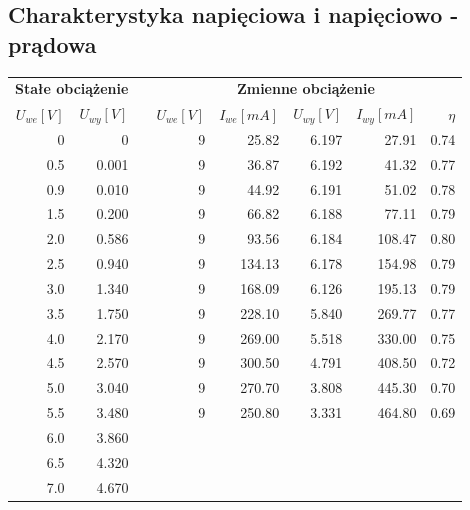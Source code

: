 \documentclass[a4paper,12pt]{article}
\begin{document}
\subsection{Charakterystyka napięciowa i napięciowo - prądowa}
  \begin{center}
  \begin{tabular}{|r|r|r|r|r|r|r|r|}
    \hline
    \multicolumn{2}{|c|}{\textbf{Stałe obciążenie}} &  & \multicolumn{5}{c|}{\textbf{Zmienne obciążenie}} \\ \cline{1-2} \cline{4-8}
    \textbf{$U_{we}[V]$} & \textbf{$U_{wy}[V]$} & & \textbf{$U_{we}[V]$} & \textbf{$I_{we}[mA]$} & \textbf{$U_{wy}[V]$} & \textbf{$I_{wy}[mA]$} &\textbf{$\eta $ } \\ \cline{1-2} \cline{4-8}
    0		& 0	&	& 9	& 25.82		& 6.197		& 27.91		& 0.74  \\ \cline{1-2} \cline{4-8}
    0.5		& 0.001 &	& 9 	& 36.87		& 6.192		& 41.32		& 0.77 \\ \cline{1-2} \cline{4-8}
    0.9		& 0.010	&	& 9	& 44.92		& 6.191		& 51.02		& 0.78	\\ \cline{1-2} \cline{4-8}
    1.5		& 0.200	&	& 9 	& 66.82		& 6.188		& 77.11		& 0.79 \\ \cline{1-2} \cline{4-8}
    2.0		& 0.586	&	& 9	& 93.56		& 6.184		& 108.47	& 0.80 \\ \cline{1-2} \cline{4-8}
    2.5		& 0.940 &	& 9	& 134.13	& 6.178		& 154.98	& 0.79 \\ \cline{1-2} \cline{4-8}
    3.0		& 1.340 &	& 9	& 168.09	& 6.126		& 195.13	& 0.79 \\ \cline{1-2} \cline{4-8}
    3.5		& 1.750 &	& 9	& 228.10	& 5.840		& 269.77	& 0.77 \\ \cline{1-2} \cline{4-8}
    4.0		& 2.170	&	& 9	& 269.00	& 5.518		& 330.00	& 0.75 \\ \cline{1-2} \cline{4-8}
    4.5		& 2.570	&	& 9	& 300.50	& 4.791		& 408.50	& 0.72 \\ \cline{1-2} \cline{4-8}
    5.0		& 3.040 &	& 9	& 270.70	& 3.808		& 445.30 	& 0.70 \\ \cline{1-2} \cline{4-8}
    5.5		& 3.480 &	& 9	& 250.80	& 3.331		& 464.80 	& 0.69 \\ \cline{1-2} \cline{4-8}
    6.0		& 3.860	&	& \multicolumn{5}{c|}{} \\ \cline{1-2} 
    6.5		& 4.320	&	& \multicolumn{5}{c|}{} \\ \cline{1-2} 
    7.0		& 4.670	&	& \multicolumn{5}{c|}{} \\ \cline{1-2} 

\end{tabular}
\end{center}
\end{document}
